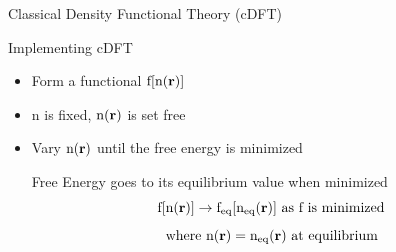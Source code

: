 \documentclass{beamer}
\renewcommand{\vec}[1]{\mathbf{#1}}
\begin{document}
\begin{frame}{Classical Density Functional Theory (cDFT)}
    \begin{block}{Implementing cDFT}
    \begin{itemize}
       \item Form a functional $\text f[\text n(\vec r)]$
       \item n is fixed, $\text n(\vec{r})$ is set free
       \item Vary $\text n(\vec{r})$ until the free energy is minimized 
       
       Free Energy goes to its equilibrium value when minimized      
       \begin{displaymath}\text f[\text n(\vec r)]\rightarrow \text f_{\text{eq}}[\text n_{\text{eq}}(\vec r)]  \mbox{ as f is minimized} \end{displaymath}
       \begin{displaymath}{\mbox{where }  \text n(\vec{r}) = \text n_{\text{eq}}(\vec r)  \mbox{ at equilibrium}}\end{displaymath}              
       
     \end{itemize} 
     \end{block}
\end{frame}
\end{document}
